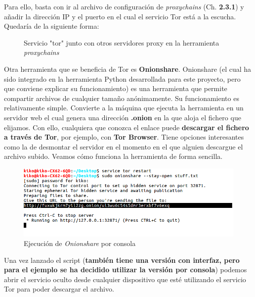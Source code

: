 Para  ello, basta con ir al archivo de configuración de \textit{proxychains} (Ch. \textbf{2.3.1}) y añadir la dirección IP y el puerto en el cual el servicio Tor está a la escucha. Quedaría de la siguiente forma:
\begin{figure}[H]
	\caption{Servicio "tor" junto con otros servidores proxy en la herramienta \textit{proxychains}}
	\label{fig:norm_Daugman}
\end{figure} 
Otra herramienta que se beneficia de Tor es \textbf{Onionshare}. 
Onionshare (el cual ha sido integrado en la herramienta Python desarrollada para este proyecto, pero que conviene explicar su funcionamiento) es una herramienta que permite compartir archivos de cualquier tamaño anónimamente. Su funcionamiento es relativamente simple. Convierte a la máquina que ejecuta la herramienta en un servidor web el cual genera una dirección \textbf{.onion} en la que aloja el fichero que elijamos. 
Con ello, cualquiera que conozca el enlace puede \textbf{descargar el fichero a través de Tor}, por ejemplo, con \textbf{Tor Browser}. 
Tiene opciones interesantes como la de desmontar el servidor en el momento en el que alguien descargue el archivo subido. Veamos cómo funciona la herramienta de forma sencilla.

\begin{figure}[h]
	\centerline{
		\mbox{\includegraphics[width=5.00in]{images/onionshare1.png}}
	}
	\caption{Ejecución de \textit{Onionshare} por consola}
	\label{fig:norm_Daugman}
\end{figure} 

Una vez lanzado el script (\textbf{también tiene una versión con interfaz, pero para el ejemplo se ha decidido utilizar la versión por consola}) podemos abrir el servicio oculto desde cualquier dispositivo que esté utilizando el servicio Tor para poder descargar el archivo.

